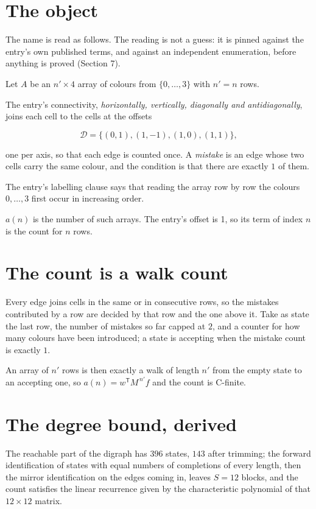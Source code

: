 \documentclass[11pt]{article}
\theoremstyle{definition}
\begin{document}
\section{The object}

The name is read as follows. The reading is not a guess: it is pinned against the entry's own published terms, and against an independent enumeration, before anything is proved (Section 7).

Let $A$ be an $n' \times 4$ array of colours from $\{0,\dots,3\}$ with $n' = n$ rows.

The entry's connectivity, {\itshape horizontally, vertically, diagonally and antidiagonally}, joins each cell to the cells at the offsets

\[\mathcal{D} = \{(0,1), (1,-1), (1,0), (1,1)\},\]

one per axis, so that each edge is counted once. A {\itshape mistake} is an edge whose two cells carry the same colour, and the condition is that there are exactly $1$ of them.

The entry's labelling clause says that reading the array row by row the colours $0,\dots,3$ first occur in increasing order.

$a(n)$ is the number of such arrays. The entry's offset is 1, so its term of index $n$ is the count for $n$ rows.

\section{The count is a walk count}

Every edge joins cells in the same or in consecutive rows, so the mistakes contributed by a row are decided by that row and the one above it. Take as state the last row, the number of mistakes so far capped at $2$, and a counter for how many colours have been introduced; a state is accepting when the mistake count is exactly $1$.

An array of $n'$ rows is then exactly a walk of length $n'$ from the empty state to an accepting one, so $a(n) = w^{\mathsf T}M^{\,n'}f$ and the count is C-finite.

\section{The degree bound, derived}

The reachable part of the digraph has $396$ states, $143$ after trimming; the forward identification of states with equal numbers of completions of every length, then the mirror identification on the edges coming in, leaves $S = 12$ blocks, and the count satisfies the linear recurrence given by the characteristic polynomial of that $12\times12$ matrix.
\end{document}
